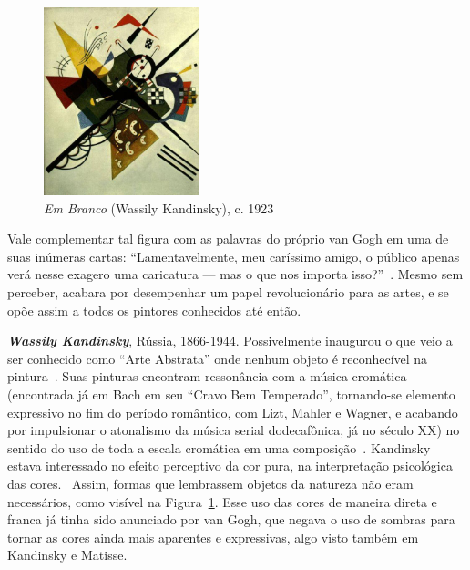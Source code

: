 \begin{figure}
  \begin{center}
    \includegraphics[width=0.4\textwidth]{figs/kandinsky_white.png}
  \end{center}
  \caption{\emph{Em Branco} (Wassily Kandinsky), c. 1923}
  \label{fig:kandinsky:white}
\end{figure}

Vale complementar tal figura com as palavras do próprio van
Gogh em uma de suas inúmeras cartas: ``Lamentavelmente, meu caríssimo
amigo, o público apenas verá nesse exagero uma caricatura --- mas o
que nos importa isso?''~\cite{van1958}. Mesmo sem perceber, acabara
por desempenhar um papel revolucionário para as artes, e se opõe assim
a todos os pintores conhecidos até então.

\textbf{\emph{Wassily Kandinsky}}, Rússia, 1866-1944. Possivelmente
inaugurou o que veio a ser conhecido como ``Arte Abstrata'' onde
nenhum objeto é reconhecível na pintura~\cite{duchting}. Suas pinturas
encontram ressonância com a música cromática (encontrada já em Bach em
seu ``Cravo Bem Temperado'', tornando-se elemento expressivo no fim do
período romântico, com Lizt, Mahler e Wagner, e acabando por
impulsionar o atonalismo da música serial dodecafônica, já no século
XX) no sentido do uso de toda a escala cromática em uma
composição~\cite{gombrich}. Kandinsky estava interessado no efeito
perceptivo da cor pura, na interpretação psicológica das
cores.~\cite{ione} Assim, formas que lembrassem objetos da natureza
não eram necessários, como visível na
Figura~\ref{fig:kandinsky:white}. Esse uso das cores de maneira direta
e franca já tinha sido anunciado por van Gogh, que negava o uso de
sombras para tornar as cores ainda mais aparentes e expressivas, algo
visto também em Kandinsky e Matisse.

